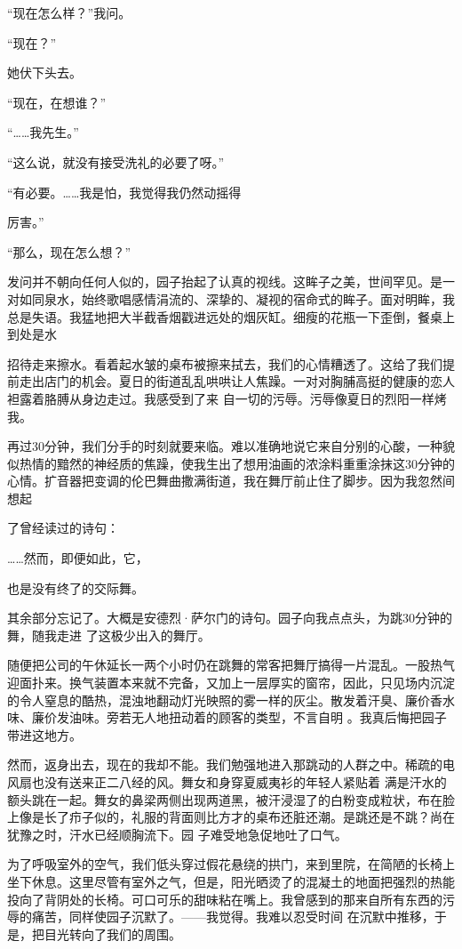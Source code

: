 \documentclass{article}
\begin{document}
“现在怎么样？”我问。 


“现在？” 


她伏下头去。 


“现在，在想谁？” 


“……我先生。” 


“这么说，就没有接受洗礼的必要了呀。” 

“有必要。……我是怕，我觉得我仍然动摇得

\newpage
厉害。” 


“那么，现在怎么想？” 


发问并不朝向任何人似的，园子抬起了认真的视线。这眸子之美，世间罕见。是一对如同泉水，始终歌唱感情涓流的、深挚的、凝视的宿命式的眸子。面对明眸，我总是失语。我猛地把大半截香烟戳进远处的烟灰缸。细瘦的花瓶一下歪倒，餐桌上到处是水

招待走来擦水。看着起水皱的桌布被擦来拭去，我们的心情糟透了。这给了我们提前走出店门的机会。夏日的街道乱乱哄哄让人焦躁。一对对胸脯高挺的健康的恋人袒露着胳膊从身边走过。我感受到了来
自一切的污辱。污辱像夏日的烈阳一样烤我。 

再过30分钟，我们分手的时刻就要来临。难以准确地说它来自分别的心酸，一种貌似热情的黯然的神经质的焦躁，使我生出了想用油画的浓涂料重重涂抹这30分钟的心情。扩音器把变调的伦巴舞曲撒满街道，我在舞厅前止住了脚步。因为我忽然间想起
\newpage

了曾经读过的诗句： 


……然而，即便如此，它， 


也是没有终了的交际舞。 

其余部分忘记了。大概是安德烈·萨尔门的诗句。园子向我点点头，为跳30分钟的舞，随我走进
了这极少出入的舞厅。 

随便把公司的午休延长一两个小时仍在跳舞的常客把舞厅搞得一片混乱。一股热气迎面扑来。换气装置本来就不完备，又加上一层厚实的窗帘，因此，只见场内沉淀的令人窒息的酷热，混浊地翻动灯光映照的雾一样的灰尘。散发着汗臭、廉价香水味、廉价发油味。旁若无人地扭动着的顾客的类型，不言自明
。我真后悔把园子带进这地方。 

然而，返身出去，现在的我却不能。我们勉强地进入那跳动的人群之中。稀疏的电风扇也没有送来正二八经的风。舞女和身穿夏威夷衫的年轻人紧贴着
\newpage
满是汗水的额头跳在一起。舞女的鼻梁两侧出现两道黑，被汗浸湿了的白粉变成粒状，布在脸上像是长了疖子似的，礼服的背面则比方才的桌布还脏还潮。是跳还是不跳？尚在犹豫之时，汗水已经顺胸流下。园
子难受地急促地吐了口气。 

为了呼吸室外的空气，我们低头穿过假花悬绕的拱门，来到里院，在简陋的长椅上坐下休息。这里尽管有室外之气，但是，阳光晒烫了的混凝土的地面把强烈的热能投向了背阴处的长椅。可口可乐的甜味粘在嘴上。我曾感到的那来自所有东西的污辱的痛苦，同样使园子沉默了。——我觉得。我难以忍受时间
在沉默中推移，于是，把目光转向了我们的周围。 
\end{document}
